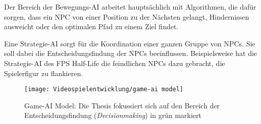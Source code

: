 Der Bereich der Bewegungs-AI arbeitet haupts\"{a}chlich mit Algorithmen, die daf\"{u}r sorgen, dass ein NPC von einer Position zu der N\"{a}chsten gelangt, Hindernissen ausweicht oder den optimalen Pfad zu einem Ziel findet.

Eine Strategie-AI sorgt f\"{u}r die Koordination einer ganzen Gruppe von NPCs. Sie soll dabei die Entscheidungsfindung der NPCs beeinflussen. Beispielsweise hat die Strategie-AI des FPS Half-Life die feindlichen NPCs dazu gebracht, die Spielerfigur zu flankieren. \autocite{AIgames}

\begin{figure}[h]
  \centering
  \texttt{[image: Videospielentwicklung/game-ai model]}
	\captionsetup{justification=justified, format=plain}
  \caption{Game-AI Model: Die Thesis fokussiert sich auf den Bereich der Entscheidungsfindung (\textit{Decisionmaking}) in gr\"{u}n markiert}
  \label{fig:game-ai model}
\end{figure}